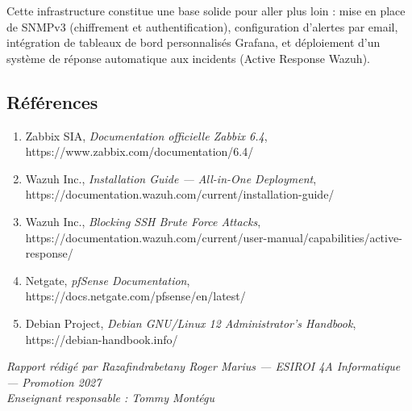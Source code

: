 Cette infrastructure constitue une base solide pour aller plus loin :
mise en place de SNMPv3 (chiffrement et authentification), configuration
d'alertes par email, intégration de tableaux de bord personnalisés
Grafana, et déploiement d'un système de réponse automatique aux
incidents (Active Response Wazuh).

\subsection{Références}\label{ruxe9fuxe9rences}

\begin{enumerate}
\def\labelenumi{\arabic{enumi}.}
\tightlist
\item
  Zabbix SIA, \emph{Documentation officielle Zabbix 6.4},
  https://www.zabbix.com/documentation/6.4/
\item
  Wazuh Inc., \emph{Installation Guide --- All-in-One Deployment},
  https://documentation.wazuh.com/current/installation-guide/
\item
  Wazuh Inc., \emph{Blocking SSH Brute Force Attacks},
  https://documentation.wazuh.com/current/user-manual/capabilities/active-response/
\item
  Netgate, \emph{pfSense Documentation},
  https://docs.netgate.com/pfsense/en/latest/
\item
  Debian Project, \emph{Debian GNU/Linux 12 Administrator's Handbook},
  https://debian-handbook.info/
\end{enumerate}

\emph{Rapport rédigé par Razafindrabetany Roger Marius --- ESIROI 4A
Informatique --- Promotion 2027}\\
\emph{Enseignant responsable : Tommy Montégu}

